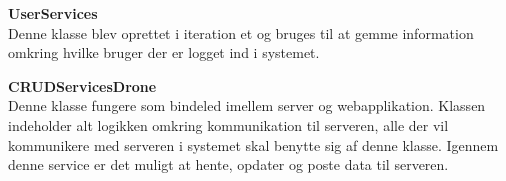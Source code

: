 \textbf{UserServices}\\
Denne klasse blev oprettet i iteration et og bruges til at gemme information omkring hvilke bruger der er logget ind i systemet.

\textbf{CRUDServicesDrone}\\
Denne klasse fungere som bindeled imellem server og webapplikation. Klassen indeholder alt logikken omkring kommunikation til serveren, alle der vil kommunikere med serveren i systemet skal benytte sig af denne klasse. Igennem denne service er det muligt at hente, opdater og poste data til serveren.



